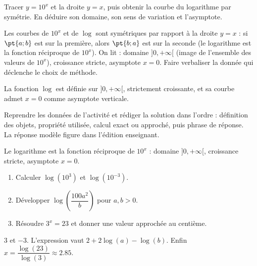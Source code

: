 \begin{activity}
Tracer $y=10^x$ et la droite $y=x$, puis obtenir la courbe du logarithme par symétrie. En déduire son domaine, son sens de variation et l'asymptote.
\begin{center}\end{center}
\end{activity}
\begin{solution}Les courbes de $10^x$ et de $\log$ sont symétriques par rapport à la droite $y=x$ : si $\pt{a;b}$ est sur la première, alors $\pt{b;a}$ est sur la seconde (le logarithme est la fonction réciproque de $10^x$). On lit : domaine $]0,+\infty[$ (image de l'ensemble des valeurs de $10^x$), croissance stricte, asymptote $x=0$. Faire verbaliser la donnée qui déclenche le choix de méthode.\end{solution}

\begin{summary}La fonction $\log$ est définie sur $]0,+\infty[$, strictement croissante, et sa courbe admet $x=0$ comme asymptote verticale.\end{summary}

\begin{example}
Reprendre les données de l'activité et rédiger la solution dans l'ordre : définition des objets, propriété utilisée, calcul exact ou approché, puis phrase de réponse. La réponse modèle figure dans l'édition enseignant.
\end{example}
\begin{solution}Le logarithme est la fonction réciproque de $10^x$ : domaine $]0,+\infty[$, croissance stricte, asymptote $x=0$.\end{solution}

\begin{exercise}[essentiel]
\begin{enumerate}\item Calculer $\log(10^3)$ et $\log(10^{-3})$.\item Développer $\log\!\left(\dfrac{100a^2}{b}\right)$ pour $a,b>0$.\item Résoudre $3^x=23$ et donner une valeur approchée au centième.\end{enumerate}
\end{exercise}
\begin{solution}$3$ et $-3$. L'expression vaut $2+2\log(a)-\log(b)$. Enfin $x=\dfrac{\log(23)}{\log(3)}\approx\num{2,85}$.\end{solution}

